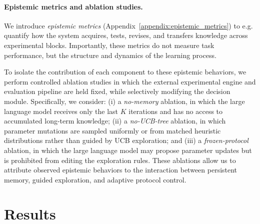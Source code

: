\documentclass[10pt,twocolumn]{article}
\begin{document}
\paragraph{Epistemic metrics and ablation studies.}
We introduce \emph{epistemic metrics} (Appendix~\ref{appendix:epistemic_metrics}) to e.g. quantify how the system acquires, tests, revises, and transfers knowledge across experimental blocks. Importantly, these metrics do not measure task performance, but the structure and dynamics of the learning process. 

To isolate the contribution of each component to these epistemic behaviors, we perform controlled ablation studies in which the external experimental engine and evaluation pipeline are held fixed, while selectively modifying the decision module. Specifically, we consider: (i) a \emph{no-memory} ablation, in which the large language model receives only the last $K$ iterations and has no access to accumulated long-term knowledge; (ii) a \emph{no-UCB-tree} ablation, in which parameter mutations are sampled uniformly or from matched heuristic distributions rather than guided by UCB exploration; and (iii) a \emph{frozen-protocol} ablation, in which the large language model may propose parameter updates but is prohibited from editing the exploration rules. These ablations allow us to attribute observed epistemic behaviors to the interaction between persistent memory, guided exploration, and adaptive protocol control.













\section{Results}
\end{document}
